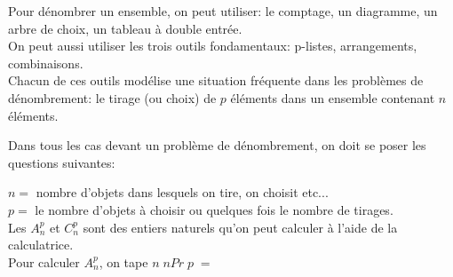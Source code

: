 




Pour dénombrer un ensemble, on peut utiliser: le comptage, un diagramme, un arbre de choix, un tableau à double entrée.\\
On peut aussi utiliser les trois outils fondamentaux:  p-listes,  arrangements,  combinaisons.\\ Chacun de ces outils  modélise  une situation fréquente  dans les problèmes de dénombrement: le tirage (ou choix) de $ p $ éléments dans un ensemble contenant  $ n $  éléments.

 Dans tous les cas devant un problème de dénombrement, on doit se poser les questions suivantes:
 
 \bigskip
 
 \begin{center}

\end{center}
 
  
  $ n= $ nombre d'objets dans lesquels on tire, on choisit etc...\\
  $ p= $  le nombre d'objets à choisir ou quelques fois le nombre de tirages.\\
  
Les $A_{n}^{p} $ et  $C_{n}^{p} $ sont des entiers naturels qu'on peut calculer à l'aide de la calculatrice.\\

 Pour calculer $A_{n}^{p} $, on tape $ n\; n Pr\; p\; =$\\

